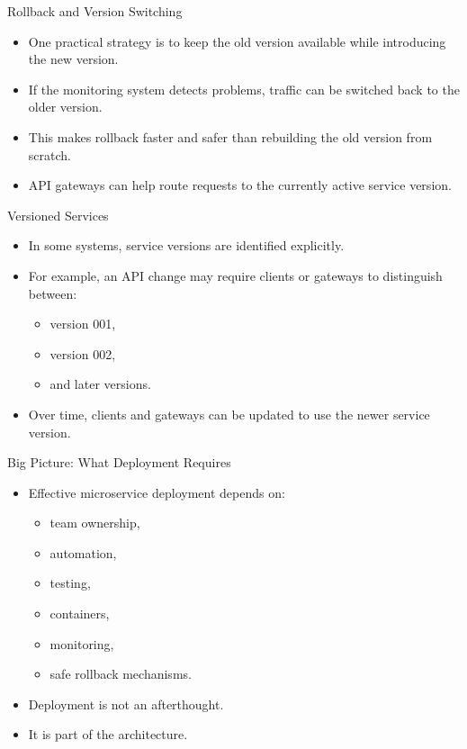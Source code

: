 \begin{frame}{Rollback and Version Switching}
\begin{itemize}
    \item One practical strategy is to keep the old version available while introducing the new version.
    \item If the monitoring system detects problems, traffic can be switched back to the older version.
    \item This makes rollback faster and safer than rebuilding the old version from scratch.
    \item API gateways can help route requests to the currently active service version.
\end{itemize}
\end{frame}

\begin{frame}{Versioned Services}
\begin{itemize}
    \item In some systems, service versions are identified explicitly.
    \item For example, an API change may require clients or gateways to distinguish between:
    \begin{itemize}
        \item version 001,
        \item version 002,
        \item and later versions.
    \end{itemize}
    \item Over time, clients and gateways can be updated to use the newer service version.
\end{itemize}
\end{frame}

\begin{frame}{Big Picture: What Deployment Requires}
\begin{itemize}
    \item Effective microservice deployment depends on:
    \begin{itemize}
        \item team ownership,
        \item automation,
        \item testing,
        \item containers,
        \item monitoring,
        \item safe rollback mechanisms.
    \end{itemize}
    \item Deployment is not an afterthought.
    \item It is part of the architecture.
\end{itemize}
\end{frame}

